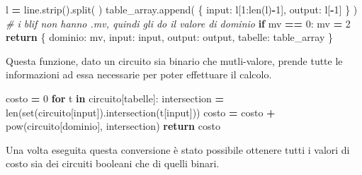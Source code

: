 \documentclass[
]{book}
\newenvironment{Shaded}{\begin{snugshade}}{\end{snugshade}}
\newcommand{\BuiltInTok}[1]{#1}
\newcommand{\CommentTok}[1]{\textcolor[rgb]{0.56,0.35,0.01}{\textit{#1}}}
\newcommand{\ControlFlowTok}[1]{\textcolor[rgb]{0.13,0.29,0.53}{\textbf{#1}}}
\newcommand{\DecValTok}[1]{\textcolor[rgb]{0.00,0.00,0.81}{#1}}
\newcommand{\KeywordTok}[1]{\textcolor[rgb]{0.13,0.29,0.53}{\textbf{#1}}}
\newcommand{\NormalTok}[1]{#1}
\newcommand{\OperatorTok}[1]{\textcolor[rgb]{0.81,0.36,0.00}{\textbf{#1}}}
\newcommand{\StringTok}[1]{\textcolor[rgb]{0.31,0.60,0.02}{#1}}
\begin{document}
\begin{Shaded}
\begin{Highlighting}[]
\NormalTok{      l }\OperatorTok{=}\NormalTok{ line.strip().split(}\StringTok{\textquotesingle{} \textquotesingle{}}\NormalTok{)}
\NormalTok{      table\_array.append(}
\NormalTok{        \{}
          \StringTok{\textquotesingle{}input\textquotesingle{}}\NormalTok{:    l[}\DecValTok{1}\NormalTok{:}\BuiltInTok{len}\NormalTok{(l)}\OperatorTok{{-}}\DecValTok{1}\NormalTok{],}
          \StringTok{\textquotesingle{}output\textquotesingle{}}\NormalTok{:   l[}\OperatorTok{{-}}\DecValTok{1}\NormalTok{]}
\NormalTok{        \}}
\NormalTok{      )}
  \CommentTok{\# i blif non hanno .mv, quindi gli do il valore di dominio}
  \ControlFlowTok{if}\NormalTok{ mv }\OperatorTok{==} \DecValTok{0}\NormalTok{:}
\NormalTok{    mv }\OperatorTok{=} \DecValTok{2}
  \ControlFlowTok{return}\NormalTok{ \{}
    \StringTok{\textquotesingle{}dominio\textquotesingle{}}\NormalTok{:   mv,}
    \StringTok{\textquotesingle{}input\textquotesingle{}}\NormalTok{:    }\BuiltInTok{input}\NormalTok{,}
    \StringTok{\textquotesingle{}output\textquotesingle{}}\NormalTok{:   output,}
    \StringTok{\textquotesingle{}tabelle\textquotesingle{}}\NormalTok{:  table\_array}
\NormalTok{  \}}
\end{Highlighting}
\end{Shaded}

\newpage

Questa funzione, dato un circuito sia binario che mutli-valore, prende tutte le informazioni ad essa necessarie per poter effettuare il calcolo.

\begin{Shaded}
\begin{Highlighting}[]
\NormalTok{costo }\OperatorTok{=} \DecValTok{0}
\ControlFlowTok{for}\NormalTok{ t }\KeywordTok{in}\NormalTok{ circuito[}\StringTok{\textquotesingle{}tabelle\textquotesingle{}}\NormalTok{]:}
\NormalTok{  intersection }\OperatorTok{=} \BuiltInTok{len}\NormalTok{(}\BuiltInTok{set}\NormalTok{(circuito[}\StringTok{\textquotesingle{}input\textquotesingle{}}\NormalTok{]).intersection(t[}\StringTok{\textquotesingle{}input\textquotesingle{}}\NormalTok{]))}
\NormalTok{  costo }\OperatorTok{=}\NormalTok{ costo }\OperatorTok{+} \BuiltInTok{pow}\NormalTok{(circuito[}\StringTok{\textquotesingle{}dominio\textquotesingle{}}\NormalTok{], intersection)}
\ControlFlowTok{return}\NormalTok{ costo}
\end{Highlighting}
\end{Shaded}

Una volta eseguita questa conversione è stato possibile ottenere tutti i valori di costo sia dei circuiti booleani che di quelli binari.
\end{document}
